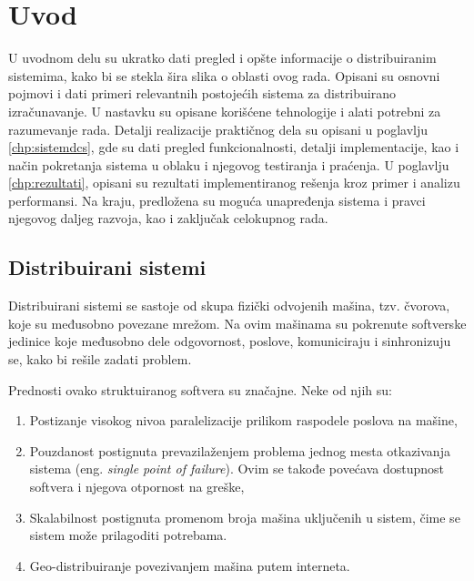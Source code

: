 \documentclass[12pt,oneside]{memoir}
\begin{document}
\frontmatter
\naslovna
\komisija
\apstrakt
\tableofcontents*

\mainmatter

\chapter{Uvod}

U uvodnom delu su ukratko dati pregled i opšte informacije o distribuiranim sistemima, kako bi se stekla šira slika o oblasti ovog rada. Opisani su osnovni pojmovi i dati primeri relevantnih postojećih sistema za distribuirano izračunavanje. U nastavku su opisane korišćene tehnologije i alati potrebni za razumevanje rada. Detalji realizacije praktičnog dela su opisani u poglavlju \ref{chp:sistemdcs}, gde su dati pregled funkcionalnosti, detalji implementacije, kao i način pokretanja sistema u oblaku i njegovog testiranja i praćenja. U poglavlju \ref{chp:rezultati}, opisani su rezultati implementiranog rešenja kroz primer i analizu performansi. Na kraju, predložena su moguća unapređenja sistema i pravci njegovog daljeg razvoja, kao i zaključak celokupnog rada.

\section{Distribuirani sistemi}

Distribuirani sistemi se sastoje od skupa fizički odvojenih mašina, tzv. čvorova, koje su međusobno povezane mrežom. Na ovim mašinama su pokrenute softverske jedinice koje međusobno dele odgovornost, poslove, komuniciraju i sinhronizuju se, kako bi rešile zadati problem.

Prednosti ovako struktuiranog softvera su značajne. Neke od njih su:
\begin{enumerate}
\item Postizanje visokog nivoa paralelizacije prilikom raspodele poslova na mašine,
\item Pouzdanost postignuta prevazilaženjem problema jednog mesta otkazivanja sistema (eng. \emph{single point of failure}). Ovim se takođe povećava dostupnost softvera i njegova otpornost na greške,
\item Skalabilnost postignuta promenom broja mašina uključenih u sistem, čime se sistem može prilagoditi potrebama.
\item Geo-distribuiranje povezivanjem mašina putem interneta.
\end{enumerate}
\end{document}
